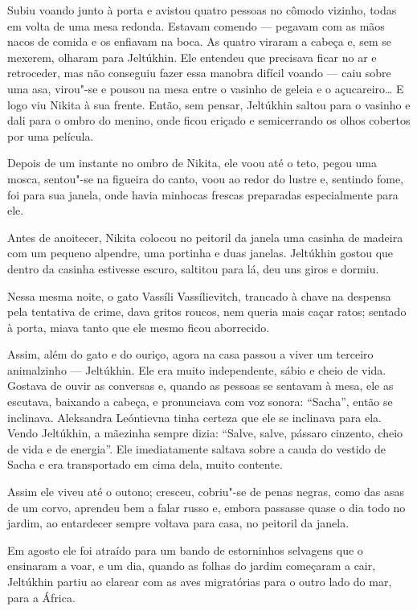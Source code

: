 Subiu voando junto à porta e avistou quatro pessoas no cômodo vizinho,
todas em volta de uma mesa redonda. Estavam comendo --- pegavam com as
mãos nacos de comida e os enfiavam na boca. As quatro viraram a cabeça
e, sem se mexerem, olharam para Jeltúkhin. Ele entendeu que precisava
ficar no ar e retroceder, mas não conseguiu fazer essa manobra difícil
voando --- caiu sobre uma asa, virou"-se e pousou na mesa entre o vasinho
de geleia e o açucareiro\ldots{} E logo viu Nikita à sua frente. Então, sem
pensar, Jeltúkhin saltou para o vasinho e dali para o ombro do menino,
onde ficou eriçado e semicerrando os olhos cobertos por uma
película.

Depois de um instante no ombro de Nikita, ele voou até o teto, pegou uma
mosca, sentou"-se na figueira do canto, voou ao redor do lustre e,
sentindo fome, foi para sua janela, onde havia minhocas frescas
preparadas especialmente para ele.

Antes de anoitecer, Nikita colocou no peitoril da janela uma casinha de
madeira com um pequeno alpendre, uma portinha e duas janelas. Jeltúkhin
gostou que dentro da casinha estivesse escuro, saltitou para lá, deu uns
giros e dormiu.

Nessa mesma noite, o gato Vassíli Vassílievitch, trancado à chave na
despensa pela tentativa de crime, dava gritos roucos, nem queria mais
caçar ratos; sentado à porta, miava tanto que ele mesmo ficou
aborrecido.

Assim, além do gato e do ouriço, agora na casa passou a viver um
terceiro animalzinho --- Jeltúkhin. Ele era muito independente, sábio e
cheio de vida. Gostava de ouvir as conversas e, quando as pessoas se
sentavam à mesa, ele as escutava, baixando a cabeça, e pronunciava com
voz sonora: ``Sacha'', então se inclinava. Aleksandra Leóntievna tinha
certeza que ele se inclinava para ela. Vendo Jeltúkhin, a
mãezinha sempre dizia: ``Salve, salve, pássaro cinzento, cheio de vida e
de energia''. Ele imediatamente saltava sobre a cauda do vestido de
Sacha e era transportado em cima dela, muito contente.

Assim ele viveu até o outono; cresceu, cobriu"-se de penas negras, como
das asas de um corvo, aprendeu bem a falar russo e, embora passasse
quase o dia todo no jardim, ao entardecer sempre voltava para casa, no
peitoril da janela.

Em agosto ele foi atraído para um bando de estorninhos selvagens que o
ensinaram a voar, e um dia, quando as folhas do jardim começaram a cair,
Jeltúkhin partiu ao clarear com as aves migratórias para o outro lado do
mar, para a África.

